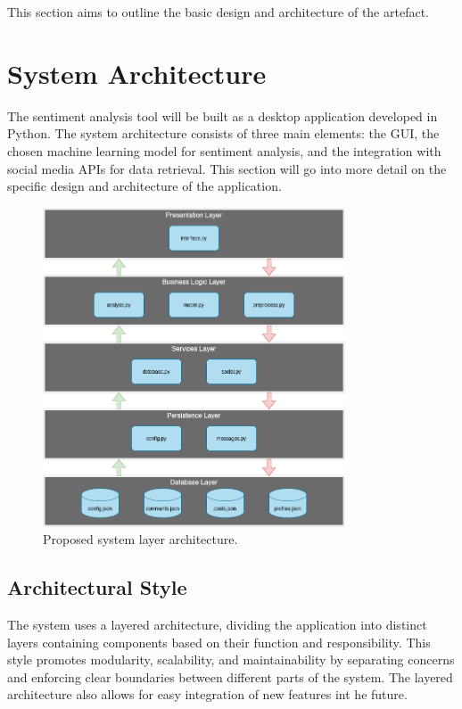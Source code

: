 This section aims to outline the basic design and architecture of the artefact.

\section{System Architecture}
The sentiment analysis tool will be built as a desktop application developed in Python. The system architecture consists of three main elements: the GUI, the chosen machine learning model for sentiment analysis, and the integration with social media APIs for data retrieval. This section will go into more detail on the specific design and architecture of the application.

\begin{figure}[h]
    \centering
    \includegraphics[width=0.8\textwidth]{figures/system-architecture-layers.png}
    \caption{Proposed system layer architecture.}
\end{figure}

    \subsection{Architectural Style}
    The system uses a layered architecture, dividing the application into distinct layers containing components based on their function and responsibility. This style promotes modularity, scalability, and maintainability by separating concerns and enforcing clear boundaries between different parts of the system. The layered architecture also allows for easy integration of new features int he future.


